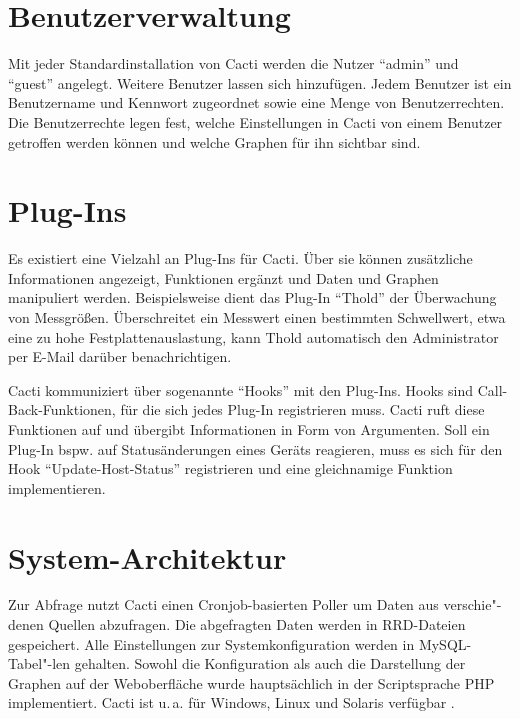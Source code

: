 \documentclass[12pt,ngerman,toc=listofnumbered,toc=bibliographynumbered,toc=index,headsepline=true]{scrbook}
\begin{document}
\section{Benutzerverwaltung}
Mit jeder Standardinstallation von Cacti werden die Nutzer \enquote{admin} und
\\ \enquote{guest} angelegt. Weitere Benutzer lassen sich hinzufügen. Jedem
Benutzer ist ein Benutzername und Kennwort zugeordnet sowie eine Menge von
Benutzerrechten. Die Benutzerrechte legen fest, welche Einstellungen in Cacti
von einem Benutzer getroffen werden können und welche Graphen für ihn sichtbar
sind.

\section{Plug-Ins}
Es existiert eine Vielzahl an Plug-Ins für Cacti. Über sie können zusätzliche
Informationen angezeigt, Funktionen ergänzt und Daten und Graphen manipuliert
werden. Beispielsweise dient das Plug-In \enquote{Thold} \cite{Conner11} der
Überwachung von Messgrößen. Überschreitet ein Messwert einen bestimmten
Schwellwert, etwa eine zu hohe Festplattenauslastung, kann Thold automatisch den
Administrator per E-Mail darüber benachrichtigen.

Cacti kommuniziert über sogenannte \enquote{Hooks} mit den Plug-Ins. Hooks sind
Call-Back-Funktionen, für die sich jedes Plug-In registrieren muss. Cacti ruft
diese Funktionen auf und übergibt Informationen in Form von Argumenten. Soll ein
Plug-In bspw. auf Statusänderungen eines Geräts reagieren, muss es sich für den
Hook \enquote{Update-Host-Status} registrieren und eine gleichnamige Funktion
implementieren.

\section{System-Architektur}
Zur Abfrage nutzt Cacti einen Cronjob-basierten Poller um Daten aus
verschie"-denen Quellen abzufragen. Die abgefragten Daten werden in RRD-Da\-teien
gespeichert. Alle Einstellungen zur Systemkonfiguration werden in
My\-SQL-Tabel"-len gehalten. Sowohl die Konfiguration als auch die Darstellung der
Graphen auf der Weboberfläche wurde hauptsächlich in der Scriptsprache PHP
implementiert. Cacti ist u.\,a. für Windows, Linux und Solaris verfügbar
\cite{Urban11}.
\end{document}
